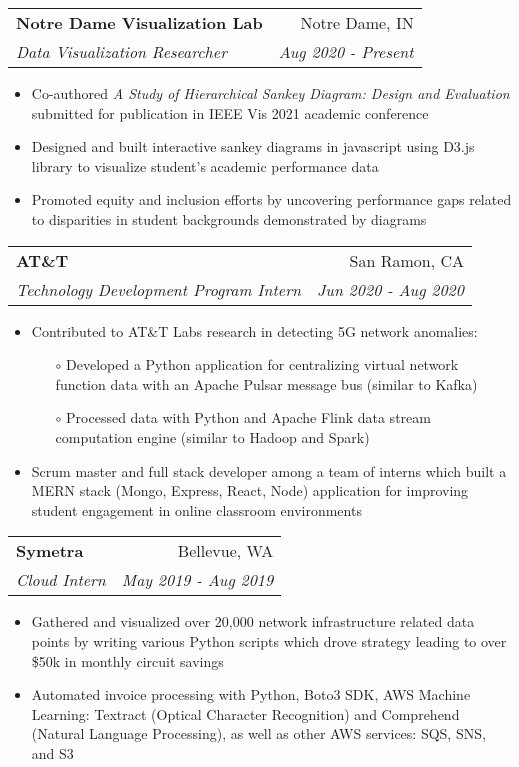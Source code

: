 \documentclass[letterpaper,10pt]{article}
\makeatletter
\newcommand{\resumeItem}[2]{
  \item\small{
    {#1}{#2 \vspace{-2pt}}
  }
}
\newcommand{\resumeSubheading}[4]{
  \vspace{-1pt}\item[]
  \begin{tabular*}{0.98\textwidth}{l@{\extracolsep{\fill}}r}
      \hspace{-10pt}\textbf{#1} & #2 \\
      \hspace{-10pt}\textit{\small#3} & \textit{\small #4} \\
    \end{tabular*}\vspace{-5pt}
}
\newcommand{\resumeItemListStart}{\begin{itemize}}
\newcommand{\resumeItemListEnd}{\end{itemize}\vspace{-5pt}}
\makeatother
\begin{document}
{    %
    \resumeSubheading
    {Notre Dame Visualization Lab}{Notre Dame, IN}
    {Data Visualization Researcher}{Aug 2020 - Present}
      \resumeItemListStart
      \resumeItem{}
        {Co-authored \textit{A Study of Hierarchical Sankey Diagram: Design and Evaluation} submitted for publication in IEEE Vis 2021 academic conference}
      \resumeItem{}
        {Designed and built interactive sankey diagrams in javascript using D3.js library to visualize student's academic performance data}
      \resumeItem{}
        {Promoted equity and inclusion efforts by uncovering performance gaps related to disparities in student backgrounds demonstrated by diagrams}
    \resumeItemListEnd

    \vspace{2pt}

    \resumeSubheading
      {AT\&T}{San Ramon, CA}
      {Technology Development Program Intern}{Jun 2020 - Aug 2020}
      \resumeItemListStart

        \resumeItem{}
          {Contributed to AT\&T Labs research in detecting 5G network anomalies: }
          \begin{itemize}
            \item[$\circ$] Developed a Python application for centralizing virtual network function data with an Apache Pulsar message bus (similar to Kafka)
            \item[$\circ$] Processed data with Python and Apache Flink data stream computation engine (similar to Hadoop and Spark)
          \end{itemize}
        \vspace{-3pt}
        \resumeItem{}
          {Scrum master and full stack developer among a team of interns which built a MERN stack (Mongo, Express, React, Node) application for improving student engagement in online classroom environments}
      \resumeItemListEnd
      
    \vspace{2pt}

    \resumeSubheading
      {Symetra}{Bellevue, WA}
      {Cloud Intern}{May 2019 - Aug 2019}
        \resumeItemListStart
        \resumeItem{}
          {Gathered and visualized over 20,000 network infrastructure related data points by writing various Python scripts which drove strategy leading to over \$50k in monthly circuit savings}
        \resumeItem{}
          {Automated invoice processing with Python, Boto3 SDK, AWS Machine Learning: Textract (Optical Character Recognition) and Comprehend (Natural Language Processing), as well as other AWS services: SQS, SNS, and S3}
      \resumeItemListEnd

}
\end{document}
